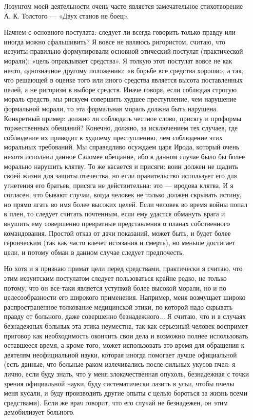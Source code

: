 Лозунгом моей деятельности очень часто является замечательное
стихотворение А. К. Толстого --- «Двух станов не боец».

Начнем с основного постулата: следует ли всегда говорить только правду
или иногда можно сфальшивить? Я вовсе не являюсь ригористом, считаю,
что иезуиты правильно формулировали основной этический постулат
(практической морали): «цель оправдывает средства». Я толкую этот
постулат вовсе не как нечто, однозначное другому положению: «в борьбе
все средства хороши», а так, что решающей в оценке того или иного
средства является высота поставленных целей, а не ригоризм в выборе
средств. Иначе говоря, если соблюдая строгую мораль средств, мы
рискуем совершить худшее преступление, чем нарушение формальной
морали, то эта формальная мораль должна быть нарушена. Конкретный
пример: должно ли соблюдать честное слово, присягу и проформы
торжественных обещаний? Конечно, должно, за исключением тех случаев,
где соблюдение их приводит к худшему преступлению, чем соблюдение этих
моральных требований. Мы справедливо осуждаем царя Ирода, который
очень нехотя исполнил данное Саломее обещание, ибо в данном случае
было бы более морально нарушить клятву. То же касается и присяги: воин
должен не щадить своей жизни для защиты отечества, но если
правительство использует его для угнетения его братьев, присяга не
действительна: это --- иродова клятва. И я согласен, что бывают
случаи, когда человек не только должен скрывать истину, но прямо лгать
во имя более высоких целей. Если человек во время войны попал в плен,
то следует считать почтенным, если ему удастся обмануть врага и
внушить ему совершенно превратные представления о планах собственного
командования. Простой отказ от дачи показаний, может быть, и будет
более героическим (так как часто влечет истязания и смерть), но меньше
достигает цели, и потому обман в данном случае следует предпочесть.

Но хотя и я признаю примат цели перед средствами, практически я
считаю, что этим иезуитским постулатом следует пользоваться крайне
редко, не только потому, что он все-таки является уступкой более
высокой морали, но и по целесообразности его широкого применения.
Например, меня возмущает широко распространенное толкование
медицинской этики, по которой надо скрывать правду от больного, даже
совершенно безнадежного... Я считаю, что и в случаях безнадежных
больных эта этика неуместна, так как серьезный человек воспримет
приговор как необходимость окончить свои дела и возможно полнее
использовать оставшееся время, а кроме того, может использовать это
время для обращения к деятелям неофициальной науки, которая иногда
помогает лучше официальной (есть данные, что больные раком
излечивались после сильных укусов пчел: я лично, если буду знать, что
у меня злокачественная опухоль, безнадежная с точки зрения официальной
науки, буду систематически лазить в ульи, чтобы пчелы меня кусали, и
буду производить другие опыты с целью бороться за жизнь всеми
средствами). Если же врач говорит, что его случай не безнадежен, он
этим демобилизует больного.

